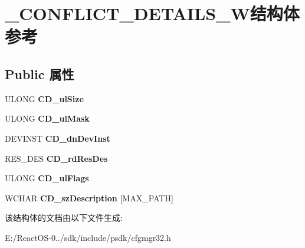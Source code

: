\hypertarget{struct___c_o_n_f_l_i_c_t___d_e_t_a_i_l_s___w}{}\section{\+\_\+\+C\+O\+N\+F\+L\+I\+C\+T\+\_\+\+D\+E\+T\+A\+I\+L\+S\+\_\+\+W结构体 参考}
\label{struct___c_o_n_f_l_i_c_t___d_e_t_a_i_l_s___w}
\subsection*{Public 属性}
\begin{DoxyCompactItemize}
\item 
\mbox{\label{struct___c_o_n_f_l_i_c_t___d_e_t_a_i_l_s___w_a939a7d988f00b378deb0db6ee024f173}} 
U\+L\+O\+NG {\bfseries C\+D\+\_\+ul\+Size}
\item 
\mbox{\label{struct___c_o_n_f_l_i_c_t___d_e_t_a_i_l_s___w_ae0804eff86e85e8aee0fa8d2bb95aaa3}} 
U\+L\+O\+NG {\bfseries C\+D\+\_\+ul\+Mask}
\item 
\mbox{\label{struct___c_o_n_f_l_i_c_t___d_e_t_a_i_l_s___w_a36912105f4f7a946d307305838cd0f82}} 
D\+E\+V\+I\+N\+ST {\bfseries C\+D\+\_\+dn\+Dev\+Inst}
\item 
\mbox{\label{struct___c_o_n_f_l_i_c_t___d_e_t_a_i_l_s___w_a2c5cf1119ab32ef59584722df8321fa0}} 
R\+E\+S\+\_\+\+D\+ES {\bfseries C\+D\+\_\+rd\+Res\+Des}
\item 
\mbox{\label{struct___c_o_n_f_l_i_c_t___d_e_t_a_i_l_s___w_a111a46907ee85124b3ef0c832e869a6d}} 
U\+L\+O\+NG {\bfseries C\+D\+\_\+ul\+Flags}
\item 
\mbox{\label{struct___c_o_n_f_l_i_c_t___d_e_t_a_i_l_s___w_aae1e5b8a868650183566972bd0d89c13}} 
W\+C\+H\+AR {\bfseries C\+D\+\_\+sz\+Description} \mbox{[}M\+A\+X\+\_\+\+P\+A\+TH\mbox{]}
\end{DoxyCompactItemize}


该结构体的文档由以下文件生成\+:\begin{DoxyCompactItemize}
\item 
E\+:/\+React\+O\+S-\/0../sdk/include/psdk/cfgmgr32.\+h\end{DoxyCompactItemize}
